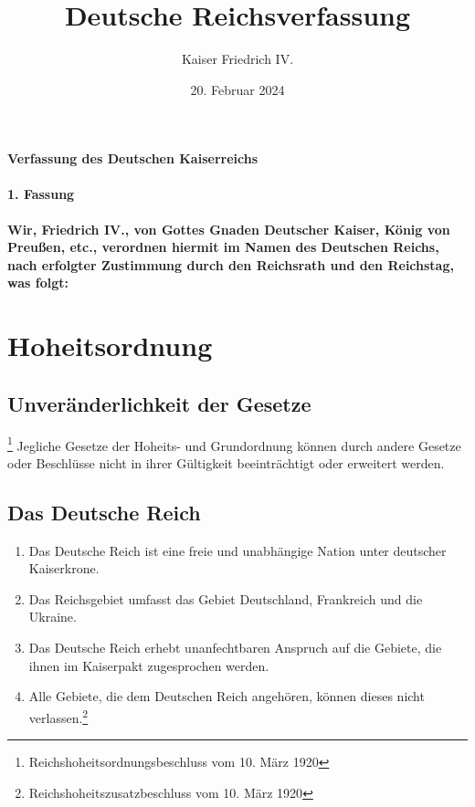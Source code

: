 \documentclass{article}
\title{Deutsche Reichsverfassung}
\author{Kaiser Friedrich IV.}
\date{20. Februar 2024}
\newenvironment*{pg}{\begin{enumerate}[(1)]}{\end{enumerate}}
\begin{document}
\maketitle
\vspace*{\fill}
\paragraph{Verfassung des Deutschen Kaiserreichs}

\newpage
{}
\vspace*{\fill}
\begin{Center}
\textbf{1. Fassung}
\vspace*{\fill}
\end{Center}
\newpage
{}
\vspace*{\fill}
\paragraph*{Wir, Friedrich IV., von Gottes Gnaden Deutscher Kaiser, König von Preußen, etc., verordnen
hiermit im Namen des Deutschen Reichs, nach erfolgter Zustimmung durch den Reichsrath und den Reichstag,
was folgt:}
\vspace*{\fill}
\newpage
\tableofcontents
\newpage
\section{Hoheitsordnung}
\subsection{Unveränderlichkeit der Gesetze}\footnote{Reichshoheitsordnungsbeschluss vom 10. März 1920}
Jegliche Gesetze der Hoheits- und Grundordnung können durch andere Gesetze oder Beschlüsse nicht in ihrer Gültigkeit beeinträchtigt oder erweitert werden.

\subsection{Das Deutsche Reich}
\begin{pg}
    \item Das Deutsche Reich ist eine freie und unabhängige Nation unter deutscher Kaiserkrone.
    \item Das Reichsgebiet umfasst das Gebiet Deutschland, Frankreich und die Ukraine.
    \item Das Deutsche Reich erhebt unanfechtbaren Anspruch auf die Gebiete, die ihnen im Kaiserpakt zugesprochen werden.
    \item Alle Gebiete, die dem Deutschen Reich angehören, können dieses nicht verlassen.\footnote{Reichshoheitszusatzbeschluss vom 10. März 1920}
\end{pg}
\end{document}
